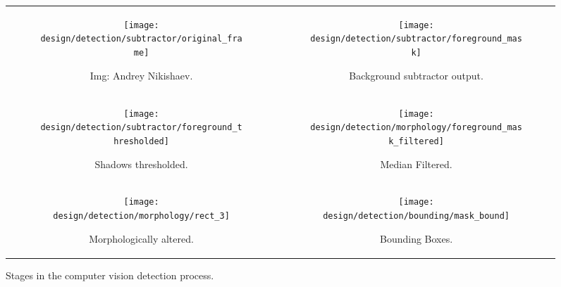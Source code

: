 \begin{figure}[H]
    \begin{tabular}{c c}
        \begin{subfigure}[b]{0.4\textwidth}
            \texttt{[image: design/detection/subtractor/original\_frame]}
            \captionsetup{format = hang}
            \caption{Img: Andrey Nikishaev.}
            \label{fig:original_frame}
        \end{subfigure} & 
        \begin{subfigure}[b]{0.4\textwidth}
            \texttt{[image: design/detection/subtractor/foreground\_mask]}
            \captionsetup{format = hang}
            \caption{Background subtractor output.}
            \label{fig:foreground_mask_unfiltered}
        \end{subfigure} \\
        \begin{subfigure}[b]{0.4\textwidth}
            \texttt{[image: design/detection/subtractor/foreground\_thresholded]}
            \captionsetup{format = hang}
            \caption{Shadows thresholded.}
            \label{fig:thresh_shadow}
        \end{subfigure} &
        \begin{subfigure}[b]{0.4\textwidth}
            \texttt{[image: design/detection/morphology/foreground\_mask\_filtered]}
            \captionsetup{format = hang}
            \caption{Median Filtered.}
            \label{fig:mask_saltnpepper}
        \end{subfigure} \\
        \begin{subfigure}[b]{0.4\textwidth}
            \texttt{[image: design/detection/morphology/rect\_3]}
            \captionsetup{format = hang}
            \caption{Morphologically altered.}
            \label{fig:morphed}
        \end{subfigure} &
        \begin{subfigure}[b]{0.4\textwidth}
            \texttt{[image: design/detection/bounding/mask\_bound]}
            \captionsetup{format = hang}
            \caption{Bounding Boxes.}
            \label{fig:bounding_boxes}
        \end{subfigure}
    \end{tabular}
    \captionsetup{format=hang}
    \caption{Stages in the computer vision detection process.}
    \label{fig:example_subtraction}
\end{figure}





